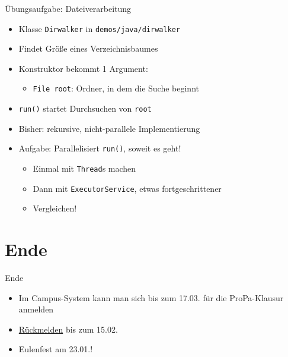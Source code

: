 \documentclass{beamer}
\begin{document}
\begin{frame}{Übungsaufgabe: Dateiverarbeitung}
	\begin{itemize}
		\item Klasse \texttt{Dirwalker} in \texttt{demos/java/dirwalker}
		\item Findet Größe eines Verzeichnisbaumes
		\pause
		\item Konstruktor bekommt 1 Argument:
		\begin{itemize}
			\item \texttt{File root}: Ordner, in dem die Suche beginnt
		\end{itemize}
		\item \texttt{run()} startet Durchsuchen von \texttt{root}
		\pause
		\item Bisher: rekursive, nicht-parallele Implementierung
		\item Aufgabe: Parallelisiert \texttt{run()}, soweit es geht!
		\begin{itemize}
			\item Einmal mit \texttt{Thread}s machen
			\item Dann mit \texttt{ExecutorService}, etwas fortgeschrittener
			\item Vergleichen!
		\end{itemize}
	\end{itemize}
\end{frame}

\section{Ende}

\begin{frame}{Ende}
	\begin{itemize}
		\item Im Campus-System kann man sich bis zum 17.03. für die ProPa-Klausur anmelden
		\item \href{https://campus.studium.kit.edu/renewal/payment.php}{Rückmelden} bis zum 15.02.
		\item Eulenfest am 23.01.!
	\end{itemize}
\end{frame}
\end{document}
